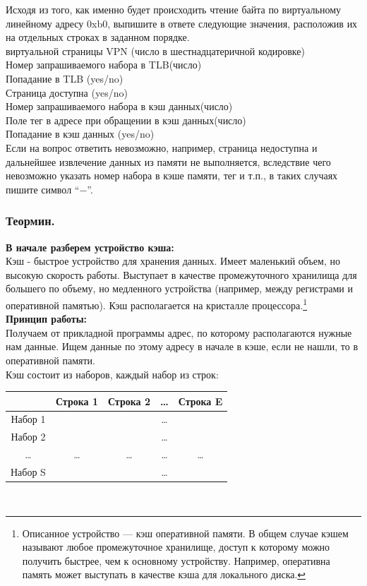 \documentclass[12pt, letterpaper]{article}
\begin{document}
Исходя из того, как именно будет происходить чтение байта по виртуальному линейному адресу 0xb0, выпишите в ответе следующие значения, расположив их на отдельных строках в заданном порядке.\\
 виртуальной страницы VPN (число в шестнадцатеричной кодировке)\\
Номер запрашиваемого набора в TLB(число)\\
Попадание в TLB (yes/no)\\
Страница доступна (yes/no)\\
Номер запрашиваемого набора в кэш данных(число)\\
Поле тег в адресе при обращении в кэш данных(число)\\
Попадание в кэш данных (yes/no)\\
Если на вопрос ответить невозможно, например, страница недоступна и дальнейшее извлечение данных из памяти не выполняется, вследствие чего невозможно указать номер набора в кэше памяти, тег и т.п., в таких случаях пишите символ ``$-$''.
\newpage
\subsubsection{Теормин.}
\textbf{В начале разберем устройство кэша:}\\
Кэш - быстрое устройство для хранения данных. Имеет маленький объем, но высокую скорость работы. Выступает в качестве промежуточного хранилища для большего по объему, но медленного устройства (например, между регистрами и оперативной памятью). Кэш располагается на кристалле процессора.\footnote{Описанное устройство — кэш оперативной памяти. В общем случае кэшем называют любое промежуточное хранилище, доступ к которому можно получить быстрее, чем к основному устройству. Например, оперативна память может выступать в качестве кэша для локального диска.}\\

\textbf{Принцип работы:}\\
Получаем от прикладной программы адрес, по которому располагаются нужные нам данные. Ищем данные по этому адресу в начале в кэше, если не нашли, то в оперативной памяти.\\

Кэш состоит из наборов, каждый набор из строк:\\

\begin{minipage}{.2\textwidth}
    \begin{tabular}{||c||c||c||c||c||}
        \hline
        & Строка 1 & Строка 2 & \dots & Строка E\\
        \hline
        \hline
        Набор 1 & & & \dots&\\
        \hline
        \hline
        Набор 2 & & & \dots&\\
        \hline
        \hline
        \dots & \dots& \dots& \dots&\dots\\
        \hline
        \hline
        Набор S & & & \dots&\\
        \hline
        \hline
    \end{tabular}
\end{minipage}
\\
\end{document}
